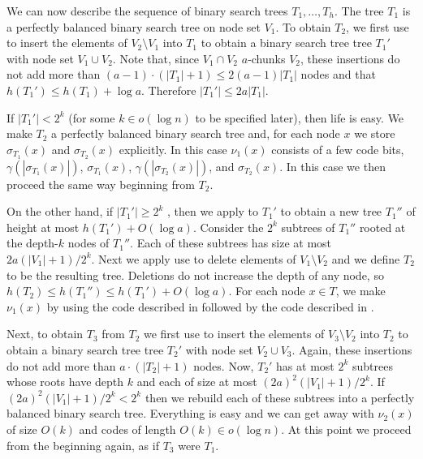 \documentclass[kpfonts]{patmorin}
\begin{document}
We can now describe the sequence of binary search trees $T_1,\ldots,T_h$. The tree $T_1$ is a perfectly balanced binary search tree on node set $V_1$.  To obtain $T_2$, we first use  to insert the elements of $V_2\setminus V_1$ into $T_1$ to obtain a binary search tree tree $T_1'$ with node set $V_1\cup V_2$.   Note that, since $V_1\cap V_2$ $a$-chunks $V_2$, these insertions do not add more than $(a-1)\cdot(|T_1|+1)\le 2(a-1)|T_1|$ nodes and that $h(T_1')\le h(T_1)+\log a$.  Therefore $|T_1'|\le 2a|T_1|$.

If $|T_1'|<2^k$ (for some $k\in o(\log n)$ to be specified later), then life is easy.  We make $T_2$ a perfectly balanced binary search tree and, for each node $x$ we store $\sigma_{T_1}(x)$ and $\sigma_{T_2}(x)$ explicitly.  In this case $\nu_1(x)$ consists of a few code bits, $\gamma(|\sigma_{T_1}(x)|)$, $\sigma_{T_1}(x)$, $\gamma(|\sigma_{T_2}(x)|)$, and $\sigma_{T_2}(x)$.  In this case we then proceed the same way beginning from $T_2$.

On the other hand, if $|T_1'|\ge 2^k$ , then we apply  to $T_1'$ to obtain a new tree $T_1''$ of height at most $h(T_1')+O(\log a)$.  Consider the $2^k$ subtrees of $T_1''$ rooted at the depth-$k$ nodes of $T_1''$.  Each of these subtrees has size at most $2a(|V_1|+1)/2^k$.  Next we apply use  to delete elements of $V_1\setminus V_2$ and we define $T_2$ to be the resulting tree.  Deletions do not increase the depth of any node, so $h(T_2)\le h(T_1'')\le h(T_1')+O(\log a)$.  For each node $x\in T$, we make $\nu_1(x)$ by using the code described in  followed by the code described in .

Next, to obtain $T_3$ from $T_2$ we first use  to insert the elements of $V_3\setminus V_2$ into $T_2$ to obtain a binary search tree tree $T_2'$ with node set $V_2\cup V_3$.   Again, these insertions do not add more than $a\cdot(|T_2|+1)$ nodes.  Now, $T_2'$ has at most $2^k$ subtrees whose roots have depth $k$ and each of size at most $(2a)^2(|V_1|+1)/2^k$.  If $(2a)^2(|V_1|+1)/2^k < 2^k$ then we rebuild each of these subtrees into a perfectly balanced binary search tree.  Everything is easy and we can get away with $\nu_2(x)$ of size $O(k)$ and codes of length $O(k)\in o(\log n)$.  At this point we proceed from the beginning again, as if $T_3$ were $T_1$.
\end{document}
